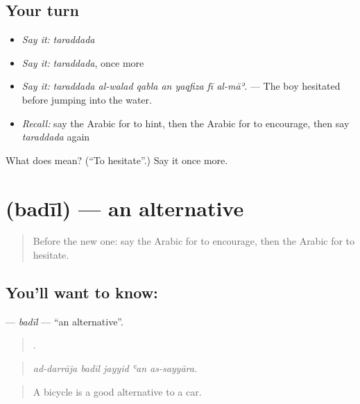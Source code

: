 \subsection*{Your turn}
\begin{itemize}
\raggedright
  \item \emph{Say it:} \emph{taraddada}
  \item \emph{Say it:} \emph{taraddada}, once more
  \item \emph{Say it:} \emph{taraddada al-walad qabla an yaqfiza fī al-māʾ.} — The boy hesitated before jumping into the water.
  \item \emph{Recall:} say the Arabic for to hint, then the Arabic for to encourage, then say \emph{taraddada} again
\end{itemize}

\begin{tcolorbox}[breakable,colback=teal!4,colframe=teal!35!black,title={Before you move on}]
What does  mean? (\textquotedblleft{}To hesitate\textquotedblright{}.) Say it once more.
\end{tcolorbox}
\section[\texorpdfstring{\ar{بديل} (badīl)}{بديل (badīl)}]{ (badīl) — an alternative}

\label{lesson:AR-C369-badil}



\begin{quote}
Before the new one: say the Arabic for to encourage, then the Arabic for to hesitate.
\end{quote}

\subsection*{You'll want to know: }
\textbf{} — \emph{badīl} — \textquotedblleft{}an alternative\textquotedblright{}.

\begin{quote}
    .
\end{quote}

\begin{quote}
\emph{ad-darrāja badīl jayyid ʿan as-sayyāra.}
\end{quote}

\begin{quote}
A bicycle is a good alternative to a car.
\end{quote}

